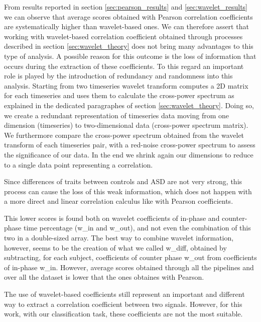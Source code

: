 \documentclass[11pt]{report}
\begin{document}
\noindent From results reported in section \ref{sec:pearson_results} and \ref{sec:wavelet_results} we can observe that average scores obtained with Pearson correlation coefficients are systematically higher than wavelet-based ones.
We can therefore assert that working with wavelet-based correlation coefficient obtained through processes described in section \ref{sec:wavelet_theory} does not bring many advantages to this type of analysis.
A possible reason for this outcome is the loss of information that occurs during the extraction of these coefficients.
To this regard an important role is played by the introduction of redundancy and randomness into this analysis. 
Starting from two timeseries wavelet transform computes a 2D matrix for each timeseries and uses them to calculate the cross-power spectrum as explained in the dedicated paragraphes of section \ref{sec:wavelet_theory}.
Doing so, we create a redundant representation of timeseries data moving from one dimension (timeseries) to two-dimensional data (cross-power spectrum matrix).
We furthermore compare the cross-power spectrum obtained from the wavelet transform of each timeseries pair, with a red-noise cross-power spectrum to assess the significance of our data.
In the end we shrink again our dimensions to reduce to a single data point representing a correlation.

Since differences of traits between controls and ASD are not very strong, this process can cause the loss of this weak information, which does not happen with a more direct and linear correlation calculus like with Pearson coefficients.

This lower scores is found both on wavelet coefficients of in-phase and counter-phase time percentage (w\_in and w\_out), and not even the combination of this two in a double-sized array.
The best way to combine wavelet information, however, seems to be the creation of what we called w\_diff, obtained by subtracting, for each subject, coefficients of counter phase w\_out from coefficients of in-phase w\_in.
However, average scores obtained through all the pipelines and over all the dataset is lower that the ones obtaines with Pearson.

The use of wavelet-based coefficients still represent an important and different way to extract a correlation coefficient between two signals.
However, for this work, with our classification task, these coefficients are not the most suitable.
\end{document}

